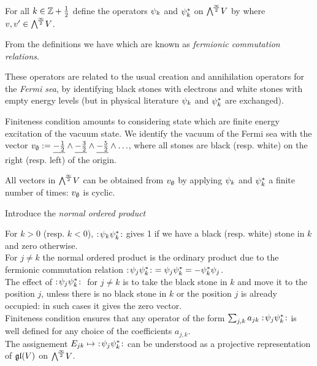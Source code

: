 \documentclass[10pt]{beamer}
\begin{document}
\begin{frame}

\begin{definition}

For all $k\in\mathbb Z+\frac12$ define the operators $\psi_k$ and $\psi_k^*$ on $\bigwedge^{\!\frac\infty2}\!V$ by 
where $v,v'\in\bigwedge^{\!\frac\infty2}\!V$.
\end{definition}

From the definitions we have
which are known as \emph{fermionic commutation relations}. 

These operators are related to the usual creation and annihilation operators for the \emph{Fermi sea}, by identifying black stones with electrons and white stones with empty energy levels (but in physical literature $\psi_k$ and $\psi_k^*$ are exchanged). 

Finiteness condition amounts to considering state which are finite energy excitation of the vacuum state. We identify the vacuum of the Fermi sea with the vector $v_\emptyset:=\underline{-\frac12}\wedge\underline{-\frac32}\wedge\underline{-\frac52}\wedge\ldots$, where all stones are black (resp. white) on the right (resp. left) of the origin.

All vectors in $\bigwedge^{\!\frac\infty2}\!V$ can be obtained from $v_\emptyset$ by applying $\psi_k$ and $\psi_k^*$ a finite number of times: $v_\emptyset$ is cyclic. 

\end{frame}

\begin{frame}

\begin{definition}

Introduce the \emph{normal ordered product}

\end{definition}

For $k>0$ (resp. $k<0$), $:\!{\psi_k\psi_k^*}\!:$ gives 1 if we have a black (resp. white) stone in $k$ and zero otherwise.\\
For $j\neq k$ the normal ordered product is the ordinary product due to the fermionic commutation relation $\no{\p_j\p_k^*}\ =\p_j\p_k^*=-\p_k^*\p_j$.\\
The effect of $:\!{\psi_j\psi_k^*}\!:\ $ for $j\neq k$ is to take the black stone in $k$ and move it to the position $j$, unless there is no black stone in $k$ or the position $j$ is already occupied: in such cases it gives the zero vector. \\
Finiteness condition ensures that any operator of the form $\sum_{j,k}a_{jk}:\!{\psi_j\psi_k^*}\!:$ is well defined for any choice of the coefficients $a_{j,k}$. \\
The assignement $E_{jk}\mapsto\ \no{\p_j\p_k^*}$ can be understood as a projective representation of $\mathfrak g\mathfrak l(V)$ on $\bigwedge^{\!\frac\infty2}\!V$. 

\end{frame}
\end{document}
